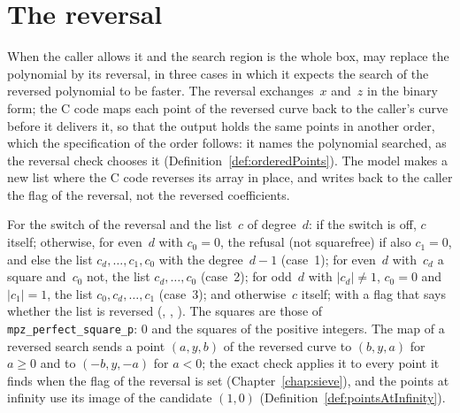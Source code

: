 \section{The reversal}\label{sec:reversal}

When the caller allows it and the search region is the whole box, \ratpoints{} may replace the
polynomial by its reversal, in three cases in which it expects the search of the reversed polynomial
to be faster. The reversal exchanges~$x$ and~$z$ in the binary form; the C code maps each point of
the reversed curve back to the caller's curve before it delivers it, so that the output holds the
same points in another order, which the specification of the order follows: it names the polynomial
searched, as the reversal check chooses it (Definition~\ref{def:orderedPoints}). The model makes a
new list where the C code reverses its array in place, and writes back to the caller the flag of the
reversal, not the reversed coefficients.

\begin{definition}\label{def:reversal}
  \leanok
  For the switch of the reversal and the list~$c$ of degree~$d$: if the switch is off, $c$ itself;
  otherwise, for even~$d$ with $c_0 = 0$, the refusal (not squarefree) if also $c_1 = 0$, and else
  the list $c_d, \dots, c_1, c_0$ with the degree~$d - 1$ (case~1); for even~$d$ with~$c_d$ a square
  and~$c_0$ not, the list $c_d, \dots, c_0$ (case~2); for odd~$d$ with $|c_d| \ne 1$, $c_0 = 0$ and
  $|c_1| = 1$, the list $c_0, c_d, \dots, c_1$ (case~3); and otherwise~$c$ itself; with a flag that
  says whether the list is reversed (,
  , ). The squares are those
  of \verb|mpz_perfect_square_p|: $0$ and the squares of the positive integers. The map of a
  reversed search sends a point $(a, y, b)$ of the reversed curve to $(b, y, a)$ for $a \ge 0$ and
  to $(-b, y, -a)$ for $a < 0$; the exact check applies it to every point it finds when the flag of
  the reversal is set (Chapter~\ref{chap:sieve}), and the points at infinity use its image of the
  candidate $(1, 0)$ (Definition~\ref{def:pointsAtInfinity}).
\end{definition}

